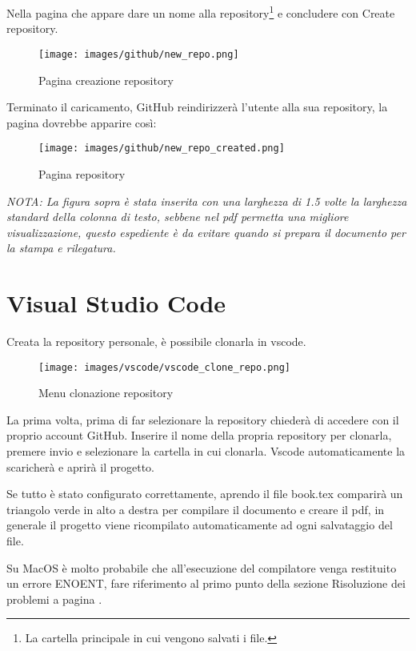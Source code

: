 \documentclass[envcountsame,envcountchap]{svmono}
\begin{document}
\label{nota_pie_pagina}
Nella pagina che appare dare un nome alla repository\footnote{La 
cartella principale in cui vengono salvati i file.} e concludere con Create repository.
\begin{figure}[H]
    \centering
    \texttt{[image: images/github/new\_repo.png]}
    \caption{Pagina creazione repository}
    \label{pagina_creazione_repository}
\end{figure}

Terminato il caricamento, GitHub reindirizzerà l'utente alla sua repository, 
la pagina dovrebbe apparire così:

\begin{figure}[H]
    \centering
    \texttt{[image: images/github/new\_repo\_created.png]}
    \caption{Pagina repository}
    \label{pagina_repository}
\end{figure}

\textit{
NOTA: La figura sopra è stata inserita con una larghezza di 1.5 volte la larghezza
standard della colonna di testo, sebbene nel pdf permetta una migliore visualizzazione,
questo espediente è da evitare quando si prepara il documento per la stampa e rilegatura.}

\newpage \label{nuova_pagina}

\section{Visual Studio Code}
Creata la repository personale, è possibile clonarla in vscode. \citep{vscodeGit}
\begin{figure}[H]
    \centering
    \texttt{[image: images/vscode/vscode\_clone\_repo.png]}
    \caption{Menu clonazione repository}
    \label{clonazione_repository}
\end{figure}
La prima volta, prima di far selezionare la repository chiederà di accedere con il 
proprio account GitHub. Inserire il nome della propria repository per clonarla, 
premere invio e selezionare la cartella in cui clonarla.
Vscode automaticamente la scaricherà e aprirà il progetto.

Se tutto è stato configurato correttamente, aprendo il file book.tex comparirà un 
triangolo verde in alto a destra per compilare il documento e creare il pdf, in generale 
il progetto viene ricompilato automaticamente ad ogni salvataggio del file.

Su MacOS è molto probabile che all'esecuzione del compilatore venga restituito un 
errore ENOENT, fare riferimento al primo punto della sezione Risoluzione dei problemi
a pagina \pageref{enoent}.
\end{document}
